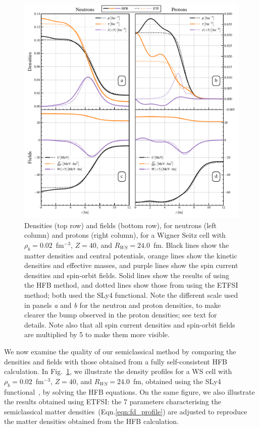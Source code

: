 \documentclass[
    amsmath,amssymb,
    aps,
    prc,
    floatfix,
]{revtex4-2}
\begin{document}
   \begin{figure}
        \centering
        \includegraphics{figs/densities_fields.pdf}
        \caption{Densities (top row) and fields (bottom row), for neutrons (left column) and protons (right column), for a Wigner Seitz cell with $\rho_b=0.02$~fm$^{-3}$, $Z=40$, and $R_{WS}=24.0$~fm. Black lines show the matter densities and central potentials, orange lines show the kinetic densities and effective masses, and purple lines show the spin current densities and spin-orbit fields. Solid lines show the results of using the HFB method, and dotted lines show those from using the ETFSI method; both used the SLy4 functional. Note the different scale used in panels \emph{a} and \emph{b} for the neutron and proton densities, to make clearer the bump observed in the proton densities; see text for details. Note also that all spin current densities and spin-orbit fields are multiplied by 5 to make them more visible.}
        \label{fig:densities_fields}
    \end{figure}

We now examine the quality of our semiclassical method by comparing the densities and fields with those obtained from a fully self-consistent HFB calculation.   
In Fig.~\ref{fig:densities_fields}, we illustrate the density profiles for a WS cell with $\rho_b=0.02$~fm$^{-3}$, $Z=40$, and $R_{WS}=24.0$~fm, obtained using the SLy4 functional~\cite{chabanat1998skyrme}, by solving the HFB equations. On the same figure, we also illustrate the results obtained using ETFSI: the 7 parameters characterising the semiclassical matter densities~(Eqn.\ref{eqn:fd_profile}) are adjusted to reproduce the matter densities obtained from the HFB calculation.
\end{document}
